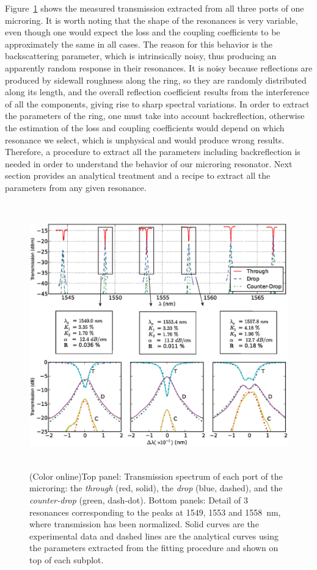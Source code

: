 \documentclass[10pt,letterpaper]{article}
\begin{document}
Figure~\ref{fig:espectro} shows the measured transmission extracted from all three ports of one microring. It is worth noting that the shape of the resonances is very variable, even though one would expect the loss and the coupling coefficients to be approximately the same in all cases. The reason for this behavior is the backscattering parameter, which is intrinsically noisy, thus producing an apparently random response in their resonances. It is noisy because reflections are produced by sidewall roughness along the ring, so they are randomly distributed along its length, and the overall reflection coefficient results from the interference of all the components, giving rise to sharp spectral variations. In order to extract the parameters of the ring, one must take into account backreflection, otherwise the estimation of the loss and coupling coefficients would depend on which resonance we select, which is unphysical and would produce wrong results. Therefore, a procedure to extract all the parameters including backreflection is needed in order to understand the behavior of our microring resonator. Next section provides an analytical treatment and a recipe to extract all the parameters from any given resonance.

\begin{figure}[t]
    \centering
    \includegraphics[width=1.0\textwidth, height=11.5cm]{exp_and_fit_data.eps}
    \caption{(Color online)Top panel: Transmission spectrum of each port of the microring: the \emph{through} (red, solid), the \emph{drop} (blue, dashed), and the \emph{counter-drop} (green, dash-dot). Bottom panels: Detail of 3 resonances corresponding to the peaks at 1549, 1553 and 1558~nm, where transmission has been normalized. Solid curves are the experimental data and dashed lines are the analytical curves using the parameters extracted from the fitting procedure and shown on top of each subplot.}

    \label{fig:espectro}

\end{figure}
\end{document}
